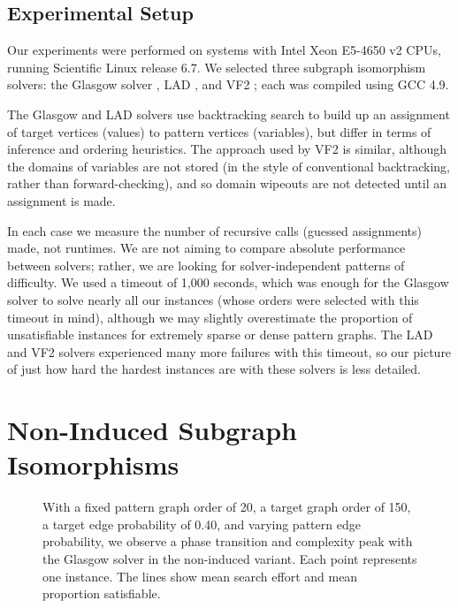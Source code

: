 \documentclass[letterpaper]{article}
\newcommand{\citep}[1]{\cite{#1}}
\begin{document}
\subsection{Experimental Setup}

Our experiments were performed on systems with Intel Xeon E5-4650 v2 CPUs, running Scientific Linux
release 6.7. We selected three subgraph isomorphism solvers: the Glasgow solver
\citep{McCreesh:2015}, LAD \citep{Solnon:2010}, and VF2 \citep{Cordella:2004}; each was compiled
using GCC 4.9.

The Glasgow and LAD solvers use backtracking search to build up an assignment of target vertices
(values) to pattern vertices (variables), but differ in terms of inference and ordering heuristics.
The approach used by VF2 is similar, although the domains of variables are not stored (in the style
of conventional backtracking, rather than forward-checking), and so domain wipeouts are not detected
until an assignment is made.

In each case we measure the number of recursive calls (guessed assignments) made, not runtimes. We
are not aiming to compare absolute performance between solvers; rather, we are looking for
solver-independent patterns of difficulty. We used a timeout of 1,000 seconds, which was enough for
the Glasgow solver to solve nearly all our instances (whose orders were selected with this timeout
in mind), although we may slightly overestimate the proportion of unsatisfiable instances for
extremely sparse or dense pattern graphs. The LAD and VF2 solvers experienced many more failures
with this timeout, so our picture of just how hard the hardest instances are with these solvers is
less detailed.

\section{Non-Induced Subgraph Isomorphisms}

\begin{figure}[tb]
    
    \caption{With a fixed pattern graph order of 20, a target graph order of 150, a target edge
        probability of 0.40, and varying pattern edge probability, we observe a phase transition and
        complexity peak with the Glasgow solver in the non-induced variant. Each point represents
        one instance. The lines show mean search effort and mean proportion satisfiable.}
    \label{figure:phase-transition}
\end{figure}
\end{document}
